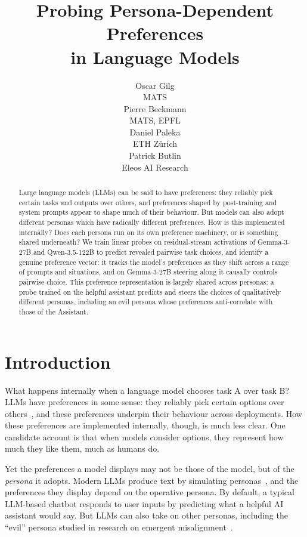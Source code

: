 \documentclass{article}
\title{Probing Persona-Dependent Preferences\\ in Language Models}
\author{%
  Oscar Gilg \\
  MATS \\
  \And
  Pierre Beckmann \\
  MATS, EPFL \\
  \And
  Daniel Paleka \\
  ETH Z\"urich \\
  \And
  Patrick Butlin \\
  Eleos AI Research \\
}
\begin{document}
\raggedbottom  %

\maketitle

\begin{abstract}
  Large language models (LLMs) can be said to have preferences: they reliably pick certain tasks and outputs over others, and preferences shaped by post-training and system prompts appear to shape much of their behaviour. But models can also adopt different personas which have radically different preferences. How is this implemented internally? Does each persona run on its own preference machinery, or is something shared underneath? We train linear probes on residual-stream activations of Gemma-3-27B and Qwen-3.5-122B to predict revealed pairwise task choices, and identify a genuine preference vector: it tracks the model's preferences as they shift across a range of prompts and situations, and on Gemma-3-27B steering along it causally controls pairwise choice. This preference representation is largely shared across personas: a probe trained on the helpful assistant predicts and steers the choices of qualitatively different personas, including an evil persona whose preferences anti-correlate with those of the Assistant. 
\end{abstract}
\section{Introduction}
\label{sec:intro}

What happens internally when a language model chooses task A over task B? LLMs have preferences in some sense: they reliably pick certain options over others~\citep{mazeika2025utility}, and these preferences underpin their behaviour across deployments. How these preferences are implemented internally, though, is much less clear. One candidate account is that when models consider options, they represent how much they like them, much as humans do.

Yet the preferences a model displays may not be those of the model, but of the \emph{persona} it adopts. Modern LLMs produce text by simulating personas~\citep{janus2022simulators,beckmann2026individuation,marks2026personaselection}, and the preferences they display depend on the operative persona. By default, a typical LLM-based chatbot responds to user inputs by predicting what a helpful AI assistant would say. But LLMs can also take on other personas, including the ``evil'' persona studied in research on emergent misalignment~\citep{betley2025emergent}.
\end{document}
